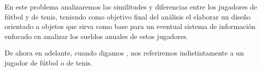 \documentclass[11pt,letterpaper]{article}
\begin{document}
\begin{spacing}{1.2}
\thispagestyle{empty}
\evaluationTitle

\newcommand{\separatorLine}{\begin{center}\rule{.6\textwidth}{1pt}\end{center}}

\begin{Problem}


En este problema analizaremos las similitudes y diferencias entre los jugadores de fútbol y de tenis,
teniendo como objetivo final del análisis el elaborar un diseño orientado a objetos que sirva como
base para un eventual sistema de información enfocado en analizar los sueldos anuales
de estos jugadores.

De ahora en adelante, cuando digamos , nos referiremos indistintamente a un jugador
de fútbol o de tenis.


\end{Problem}
\end{spacing}
\end{document}
